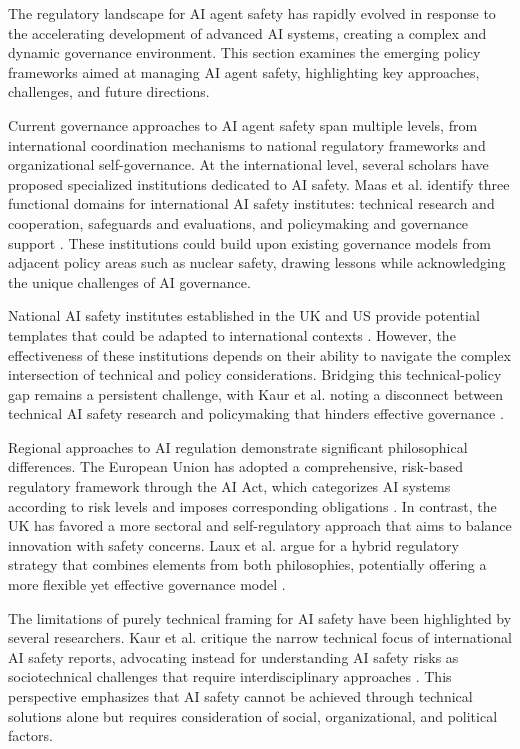 \documentclass[conference]{IEEEtran}
\begin{document}
The regulatory landscape for AI agent safety has rapidly evolved in response to the accelerating development of advanced AI systems, creating a complex and dynamic governance environment. This section examines the emerging policy frameworks aimed at managing AI agent safety, highlighting key approaches, challenges, and future directions.

Current governance approaches to AI agent safety span multiple levels, from international coordination mechanisms to national regulatory frameworks and organizational self-governance. At the international level, several scholars have proposed specialized institutions dedicated to AI safety. Maas et al. identify three functional domains for international AI safety institutes: technical research and cooperation, safeguards and evaluations, and policymaking and governance support \cite{2409.10536}. These institutions could build upon existing governance models from adjacent policy areas such as nuclear safety, drawing lessons while acknowledging the unique challenges of AI governance.

National AI safety institutes established in the UK and US provide potential templates that could be adapted to international contexts \cite{2409.10536}. However, the effectiveness of these institutions depends on their ability to navigate the complex intersection of technical and policy considerations. Bridging this technical-policy gap remains a persistent challenge, with Kaur et al. noting a disconnect between technical AI safety research and policymaking that hinders effective governance \cite{2503.04743}.

Regional approaches to AI regulation demonstrate significant philosophical differences. The European Union has adopted a comprehensive, risk-based regulatory framework through the AI Act, which categorizes AI systems according to risk levels and imposes corresponding obligations \cite{2310.04072}. In contrast, the UK has favored a more sectoral and self-regulatory approach that aims to balance innovation with safety concerns. Laux et al. argue for a hybrid regulatory strategy that combines elements from both philosophies, potentially offering a more flexible yet effective governance model \cite{2310.04072}.

The limitations of purely technical framing for AI safety have been highlighted by several researchers. Kaur et al. critique the narrow technical focus of international AI safety reports, advocating instead for understanding AI safety risks as sociotechnical challenges that require interdisciplinary approaches \cite{2503.04743}. This perspective emphasizes that AI safety cannot be achieved through technical solutions alone but requires consideration of social, organizational, and political factors.
\end{document}
